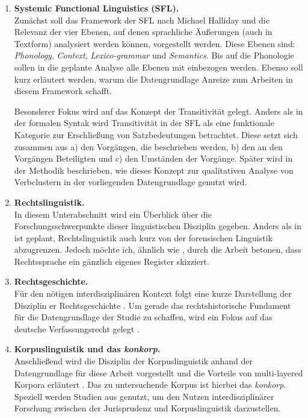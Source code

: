 \begin{enumerate}
\item \textbf{Systemic Functional Linguistics (SFL).}\\ Zunächst soll das Framework der SFL nach Michael Halliday und die Relevanz der vier Ebenen, auf denen sprachliche Äußerungen (auch in Textform) analysiert werden können, vorgestellt werden. Diese Ebenen sind: \textit{Phonology}, \textit{Context}, \textit{Lexico-grammar} und \textit{Semantics}. Bis auf die Phonologie sollen in die geplante Analyse alle Ebenen mit einbezogen werden. Ebenso soll kurz erläutert werden, warum die Datengrundlage Anreize zum Arbeiten in diesem Framework schafft.

Besonderer Fokus wird auf das Konzept der Transitivität gelegt. Anders als in der formalen Syntak wird Transitivität in der SFL als eine funktionale Kategorie zur Erschließung von Satzbedeutungen betrachtet. Diese setzt sich zusammen aus a) den Vorgängen, die beschrieben werden, b) den an den Vorgängen Beteiligten und c) den Umständen der Vorgänge. Später wird in der Methodik beschrieben, wie dieses Konzept zur qualitativen Analyse von Verbclustern in der vorliegenden Datengrundlage genutzt wird.
\item \textbf{Rechtslinguistik.}\\ In diesem Unterabschnitt wird ein Überblick über die Forschungsschwerpunkte dieser linguistischen Disziplin gegeben. Anders als in \citealt{Thurau2025} ist geplant, Rechtslinguistik auch kurz von der forensischen Linguistik abzugrenzen. Jedoch möchte ich, ähnlich wie \citeauthor{Thurau2025}, durch die Arbeit betonen, dass Rechtssprache ein gänzlich eigenes Register skizziert.
\item \textbf{Rechtsgeschichte.}\\ Für den nötigen interdisziplinären Kontext folgt eine kurze Darstellung der Disziplin er Rechtsgeschichte \citep{Hähnchen2016}. Um gerade das rechtshistorische Fundament für die Datengrundlage der Studie zu schaffen, wird ein Fokus auf das deutsche Verfassungsrecht gelegt \citep{WeberFas1983,IpsenEtAl2022}.
\item \textbf{Korpuslinguistik und das \textit{konkorp}.}\\ Anschließend wird die Disziplin der Korpuslinguistik anhand der Datengrundlage für diese Arbeit vorgestellt und die Vorteile von multi-layered Korpora erläutert \citep{OdebrechtEtAl2016}.  Das zu untersuchende Korpus ist hierbei das \textit{konkorp}. Speziell werden Studien aus \citealt{VogelEtAl2022} genutzt, um den Nutzen interdisziplinärer Forschung zwischen der Jurisprudenz und Korpuslinguistik darzustellen.
\end{enumerate}


